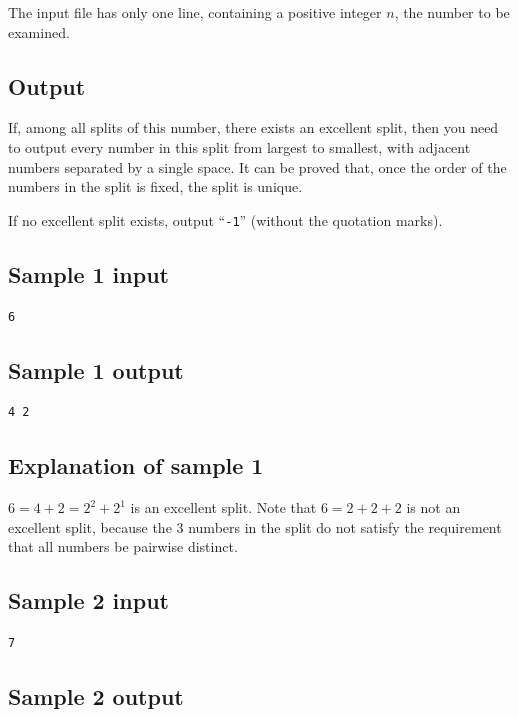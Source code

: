 \documentclass[11pt]{article}
\begin{document}
The input file has only one line, containing a positive integer $n$,
the number to be examined.

\subsection*{Output}

If, among all splits of this number, there exists an excellent split, then
you need to output every number in this split from largest to smallest,
with adjacent numbers separated by a single space.
It can be proved that, once the order of the numbers in the split is fixed,
the split is unique.

If no excellent split exists, output ``\texttt{-1}'' (without the quotation
marks).

\subsection*{Sample 1 input}

\begin{verbatim}
6
\end{verbatim}

\subsection*{Sample 1 output}

\begin{verbatim}
4 2
\end{verbatim}

\subsection*{Explanation of sample 1}

$6 = 4 + 2 = 2^2 + 2^1$ is an excellent split.
Note that $6 = 2 + 2 + 2$ is not an excellent split, because the $3$
numbers in the split do not satisfy the requirement that all numbers be
pairwise distinct.

\subsection*{Sample 2 input}

\begin{verbatim}
7
\end{verbatim}

\subsection*{Sample 2 output}
\end{document}
